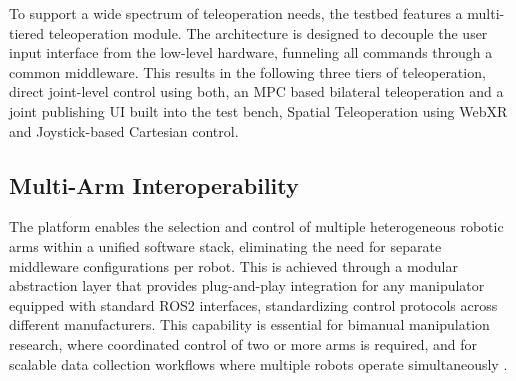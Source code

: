 \documentclass[a4paper, 10pt, conference]{ieeeconf}      %
\begin{document}
To support a wide spectrum of teleoperation needs, the testbed features a multi-tiered teleoperation module. The architecture is designed to decouple the user input interface from the low-level hardware, funneling all commands through a common middleware. This results in the following three tiers of teleoperation, direct joint-level control using both, an MPC based bilateral teleoperation and a joint publishing UI built into the test bench, Spatial Teleoperation using WebXR and Joystick-based Cartesian control.


\subsection{Multi-Arm Interoperability}
The platform enables the selection and control of multiple heterogeneous robotic arms within a unified software stack, eliminating the need for separate middleware configurations per robot. This is achieved through a modular abstraction layer that provides plug-and-play integration for any manipulator equipped with standard ROS2 interfaces, standardizing control protocols across different manufacturers. This capability is essential for bimanual manipulation research, where coordinated control of two or more arms is required, and for scalable data collection workflows where multiple robots operate simultaneously \cite{dass2023pato, unibidex}.

\end{document}
